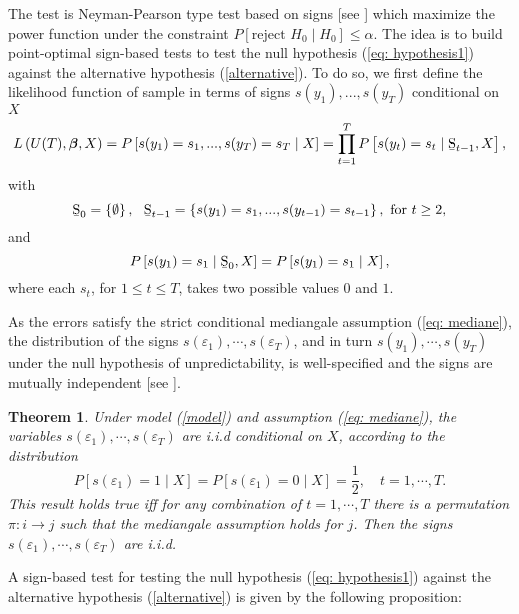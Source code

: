 \documentclass[harvard,11pt]{article}
\newtheorem{theorem}{Theorem}
\begin{document}
The test is Neyman-Pearson type test based on signs [see \citet{lehmann2006testing}] which maximize the
power function under the constraint $P\left[ \text{reject }%
H_{0}\mid H_{0}\right] \leq \alpha$. The idea is to build		
point-optimal sign-based tests to test the null hypothesis (\ref{eq:
hypothesis1}) against the alternative hypothesis (\ref{alternative}). To do
so, we first define the likelihood function of sample in terms of signs $%
s(y_{1}),...,s(y_{T})$ conditional on $X$%
\begin{equation*}
L\left( U(T),\bm{\beta}, X \right) =P\left[
s(y_{1})=s_{1},...,s(y_{T})=s_{T}\mid X\right] =\prod\limits_{t=1}^{T} P\left[ s(y_{t})=s_{t}\mid \text{\b{S}}_{t-1}, X\right] ,
\end{equation*}%
with 
\begin{equation*}
\text{\b{S}}_{0}=\left\{ \emptyset \right\} ,\text{ \ \b{S}}_{t-1}=\left\{
s(y_{1})=s_{1},...,s(y_{t-1})=s_{t-1}\right\} ,\text{ for }t\geq 2,
\end{equation*}%
and%
\begin{equation*}
P\left[ s(y_{1})=s_{1}\mid \text{\b{S}}_{0},X\right] =P%
\left[ s(y_{1})=s_{1}\mid X\right] ,
\end{equation*}%
where each $s_{t}$, for $1\leq t\leq T$, takes two possible values $0$ and $1
$. 

 As the errors satisfy the strict conditional mediangale assumption (\ref{eq: mediane}), the distribution of the signs $s(\varepsilon_1),\cdots,s(\varepsilon_T)$, and in turn $s(y_1),\cdots, s(y_T)$ under the null hypothesis of unpredictability, is well-specified and the signs are mutually independent [see \citet{coudin2009finite}].

\begin{theorem}\label{Theorem1}
Under model (\ref{model}) and assumption (\ref{eq: mediane}), the variables $s(\varepsilon_1),\cdots,s(\varepsilon_T)$ are i.i.d conditional on $X$, according to the distribution
\[
P[s(\varepsilon_1)=1\mid X]=P[s(\varepsilon_1)=0\mid X]=\frac{1}{2},\quad t=1,\cdots,T.
\]
This result holds true iff for any combination of $t=1,\cdots,T$ there is a permutation $\pi: i\rightarrow j$ such that the mediangale assumption holds for $j$. Then the signs $s(\varepsilon_1),\cdots,s(\varepsilon_T)$ are i.i.d.

\end{theorem} A sign-based test for testing the null hypothesis (\ref{eq: hypothesis1})
against the alternative hypothesis (\ref{alternative}) is given by the
following proposition:
\end{document}
